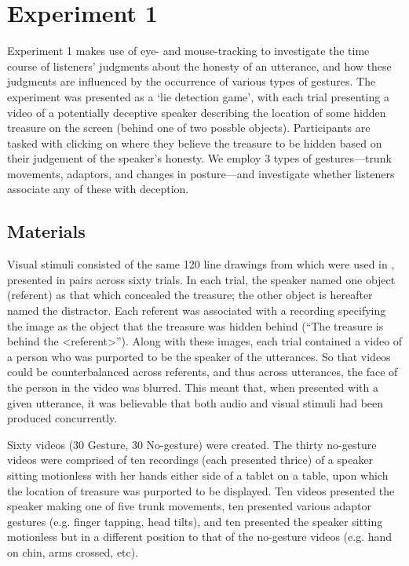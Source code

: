 \documentclass[a4paper,man,natbib]{apa6}
\begin{document}
\section{Experiment 1}
Experiment 1 makes use of eye- and mouse-tracking to investigate the time course of listeners' judgments about the honesty of an utterance, and how these judgments are influenced by the occurrence of various types of gestures. 
The experiment was presented as a `lie detection game', with each trial presenting a video of a potentially deceptive speaker describing the location of some hidden treasure on the screen (behind one of two possble objects). 
Participants are tasked with clicking on where they believe the treasure to be hidden based on their judgement of the speaker's honesty.
We employ 3 types of gestures---trunk movements, adaptors, and changes in posture---and investigate whether listeners associate any of these with deception.

\subsection{Materials}
Visual stimuli consisted of the same 120 line drawings from \citet{Snodgrass1980} which were used in \citet{Loy2017}, presented in pairs across sixty trials. 
In each trial, the speaker named one object (referent) as that which concealed the treasure; the other object is hereafter named the distractor.
Each referent was associated with a recording specifying the image as the object that the treasure was hidden behind (``The treasure is behind the <referent>'').
Along with these images, each trial contained a video of a person who was purported to be the speaker of the utterances. 
So that videos could be counterbalanced across referents, and thus across utterances, the face of the person in the video was blurred. 
This meant that, when presented with a given utterance, it was believable that both audio and visual stimuli had been produced concurrently. 

Sixty videos (30 Gesture, 30 No-gesture) were created. 
The thirty no-gesture videos were comprised of ten recordings (each presented thrice) of a speaker sitting motionless with her hands either side of a tablet on a table, upon which the location of treasure was purported to be displayed.
Ten videos presented the speaker making one of five trunk movements, ten presented various adaptor gestures (e.g. finger tapping, head tilts), and ten presented the speaker sitting motionless but in a different position to that of the no-gesture videos (e.g. hand on chin, arms crossed, etc).
\end{document}
